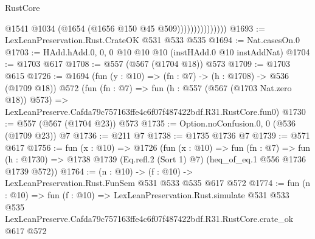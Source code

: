 \begin{lexlean}{RustCore}
\begin{coremodule}
                              @1541
                              @1034
                              (@1654 (@1656 @150 @45 @509)))))))))))))))
@1693 := LexLeanPreservation.Rust.CrateOK @531 @533 @535
@1694 := Nat.casesOn.{0}
@1703 := HAdd.hAdd.{0, 0, 0} @10 @10 @10 (instHAdd.{0} @10 instAddNat)
@1704 := @1703 @617
@1708 := @557 (@567 (@1704 @18)) @573
@1709 := @1703 @615
@1726 := @1694
    (fun (y : @10) => (fn : @7) -> (h : @1708) -> @536 (@1709 @18))
    @572
    (fun (fn : @7) =>
    fun (h : @557 (@567 (@1703 Nat.zero @18)) @573) =>
    LexLeanPreserve.Cafda79c757163ffe4c6f07f487422bdf.R31.RustCore.fun0)
@1730 := @557 (@567 (@1704 @23)) @573
@1735 := Option.noConfusion.{0, 0} (@536 (@1709 @23)) @7
@1736 := @211 @7
@1738 := @1735 @1736 @7
@1739 := @571 @617
@1756 := fun (x : @10) =>
  @1726
    (fun (x : @10) =>
    fun (fn : @7) =>
    fun (h : @1730) => @1738 @1739 (Eq.refl.{2} (Sort 1) @7) (heq_of_eq.{1} @556 @1736 @1739 @572))
@1764 := (n : @10) -> (f : @10) -> LexLeanPreservation.Rust.FunSem @531 @533 @535 @617 @572
@1774 := fun (n : @10) =>
  fun (f : @10) =>
  LexLeanPreservation.Rust.simulate
    @531
    @533
    @535
    LexLeanPreserve.Cafda79c757163ffe4c6f07f487422bdf.R31.RustCore.crate_ok
    @617
    @572
\end{coremodule}
\end{lexlean}
